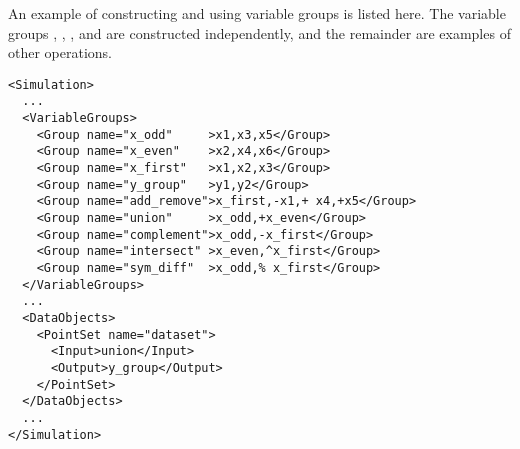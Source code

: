 An example of constructing and using variable groups is listed here.  The variable groups ,
, ,  and   are constructed independently, and the
remainder are examples of other operations.
\begin{lstlisting}[style=XML,morekeywords={name,file}] %moreemph={name,file}]
<Simulation>
  ...
  <VariableGroups>
    <Group name="x_odd"     >x1,x3,x5</Group>
    <Group name="x_even"    >x2,x4,x6</Group>
    <Group name="x_first"   >x1,x2,x3</Group>
    <Group name="y_group"   >y1,y2</Group>
    <Group name="add_remove">x_first,-x1,+ x4,+x5</Group>
    <Group name="union"     >x_odd,+x_even</Group>
    <Group name="complement">x_odd,-x_first</Group>
    <Group name="intersect" >x_even,^x_first</Group>
    <Group name="sym_diff"  >x_odd,% x_first</Group>
  </VariableGroups>
  ...
  <DataObjects>
    <PointSet name="dataset">
      <Input>union</Input>
      <Output>y_group</Output>
    </PointSet>
  </DataObjects>
  ...
</Simulation>
\end{lstlisting}
